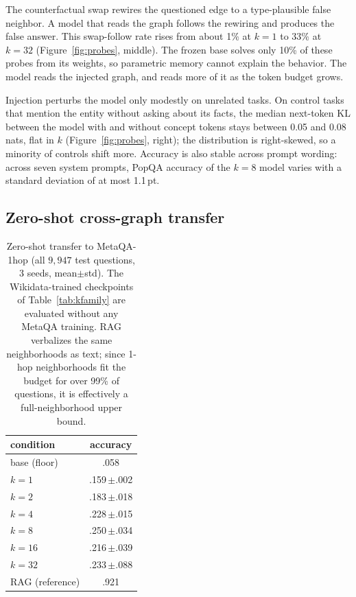 \documentclass{article}
\newcommand{\popqa}{PopQA}
\begin{document}
The counterfactual swap rewires the questioned edge to a type-plausible false neighbor. A
model that reads the graph follows the rewiring and produces the false answer. This
swap-follow rate rises from about 1\% at $k{=}1$ to 33\% at $k{=}32$
(Figure~\ref{fig:probes}, middle). The frozen base solves only 10\% of these probes from its
weights, so parametric memory cannot explain the behavior. The model reads the injected
graph, and reads more of it as the token budget grows.

Injection perturbs the model only modestly on unrelated tasks. On control tasks that mention
the entity without asking about its facts, the median next-token KL between the model with and
without concept tokens stays between 0.05 and 0.08 nats, flat in $k$ (Figure~\ref{fig:probes},
right); the distribution is right-skewed, so a minority of controls shift more. Accuracy is also stable across prompt wording: across seven system prompts, \popqa{}
accuracy of the $k{=}8$ model varies with a standard deviation of at most 1.1\,pt.

\subsection{Zero-shot cross-graph transfer}
\label{sec:transfer}

\begin{table}[t]
  \caption{Zero-shot transfer to MetaQA-1hop (all $9{,}947$ test questions, 3 seeds,
  mean$\pm$std). The Wikidata-trained checkpoints of Table~\ref{tab:kfamily} are evaluated
  without any MetaQA training. RAG verbalizes the same neighborhoods as text; since 1-hop
  neighborhoods fit the budget for over 99\% of questions, it is effectively a
  full-neighborhood upper bound.}
  \label{tab:transfer}
  \centering
  \small
  \begin{tabular}{lc}
    \toprule
    condition & accuracy\\
    \midrule
    base (floor) & .058\\
    $k{=}1$ & .159\,$\pm$.002\\
    $k{=}2$ & .183\,$\pm$.018\\
    $k{=}4$ & .228\,$\pm$.015\\
    $k{=}8$ & .250\,$\pm$.034\\
    $k{=}16$ & .216\,$\pm$.039\\
    $k{=}32$ & .233\,$\pm$.088\\
    RAG (reference) & .921\\
    \bottomrule
  \end{tabular}
\end{table}
\end{document}
